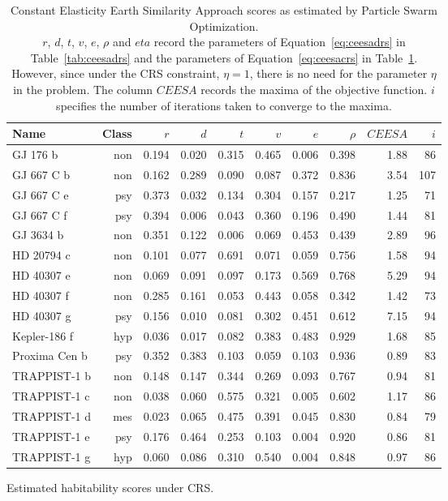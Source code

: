 \documentclass[9pt]{article}
\newcommand{\pso}{Particle Swarm Optimization}
\begin{document}
\begin{table}
  \vspace{4em}
  
  \begin{subtable}{\textwidth}
    \centering
    \begin{tabular}{l r r r r r r r r r}
      \toprule
      Name & Class & $r$ & $d$ & $t$ & $v$ & $e$ & $\rho$ & $\mathit{CEESA}$ & $i$\\
      \midrule
      GJ 176 b & non & 0.194 & 0.020 & 0.315 & 0.465 & 0.006 & 0.398 & 1.88 &  86\\
      GJ 667 C b & non & 0.162 & 0.289 & 0.090 & 0.087 & 0.372 & 0.836 & 3.54 & 107\\
      GJ 667 C e & psy & 0.373 & 0.032 & 0.134 & 0.304 & 0.157 & 0.217 & 1.25 &  71\\
      GJ 667 C f & psy & 0.394 & 0.006 & 0.043 & 0.360 & 0.196 & 0.490 & 1.44 &  81\\
      GJ 3634 b & non & 0.351 & 0.122 & 0.006 & 0.069 & 0.453 & 0.439 & 2.89 &  96\\
      HD 20794 c & non & 0.101 & 0.077 & 0.691 & 0.071 & 0.059 & 0.756 & 1.58 &  94\\
      HD 40307 e & non & 0.069 & 0.091 & 0.097 & 0.173 & 0.569 & 0.768 & 5.29 &  94\\
      HD 40307 f & non & 0.285 & 0.161 & 0.053 & 0.443 & 0.058 & 0.342 & 1.42 &  73\\
      HD 40307 g & psy & 0.156 & 0.010 & 0.081 & 0.302 & 0.451 & 0.612 & 7.15 &  94\\
      Kepler-186 f & hyp & 0.036 & 0.017 & 0.082 & 0.383 & 0.483 & 0.929 & 1.68 &  85\\
      Proxima Cen b & psy & 0.352 & 0.383 & 0.103 & 0.059 & 0.103 & 0.936 & 0.89 &  83\\
      TRAPPIST-1 b & non & 0.148 & 0.147 & 0.344 & 0.269 & 0.093 & 0.767 & 0.94 &  81\\
      TRAPPIST-1 c & non & 0.038 & 0.060 & 0.575 & 0.321 & 0.005 & 0.602 & 1.17 &  86\\
      TRAPPIST-1 d & mes & 0.023 & 0.065 & 0.475 & 0.391 & 0.045 & 0.830 & 0.84 &  79\\
      TRAPPIST-1 e & psy & 0.176 & 0.464 & 0.253 & 0.103 & 0.004 & 0.920 & 0.86 &  81\\
      TRAPPIST-1 g & hyp & 0.060 & 0.086 & 0.310 & 0.540 & 0.004 & 0.848 & 0.97 &  86\\
      \bottomrule
    \end{tabular}
    \caption{Estimated habitability scores under CRS.}\label{tab:ceesacrs}
  \end{subtable}
  \caption{Constant Elasticity Earth Similarity Approach scores as estimated by \pso.\\
      \footnotesize $r$, $d$, $t$, $v$, $e$, $\rho$ and $eta$ record the parameters of Equation~\ref{eq:ceesadrs} in
      Table~\ref{tab:ceesadrs} and the parameters of Equation~\ref{eq:ceesacrs} in Table~\ref{tab:ceesacrs}. However,
      since under the CRS constraint, $\eta=1$, there is no need for the parameter $\eta$ in the problem. The column
      $\mathit{CEESA}$ records the maxima of the objective function. $i$ specifies the number of iterations taken to
      converge to the maxima.
    }
\end{table}
\end{document}

